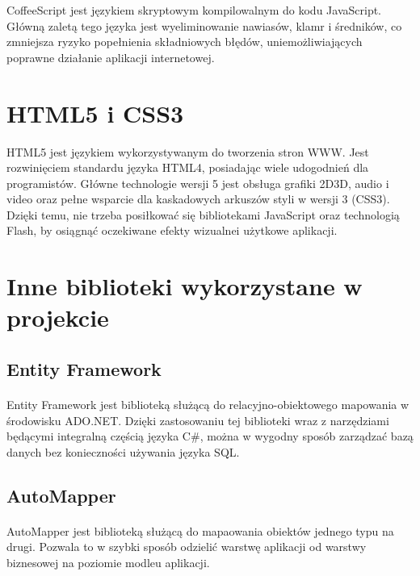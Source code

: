 CoffeeScript jest językiem skryptowym kompilowalnym do kodu JavaScript. Główną zaletą tego języka jest wyeliminowanie nawiasów, klamr i średników, co zmniejsza ryzyko popełnienia składniowych błędów, uniemożliwiających poprawne działanie aplikacji internetowej.

\section{HTML5 i CSS3} %
\label{par:html5_i_css3}

HTML5 jest językiem wykorzystywanym do tworzenia stron WWW. Jest rozwinięciem standardu języka HTML4, posiadając wiele udogodnień dla programistów. Główne technologie wersji 5 jest obsługa grafiki 2D\/3D, audio i video oraz pełne wsparcie dla kaskadowych arkuszów styli w wersji 3 (CSS3). Dzięki temu, nie trzeba posiłkować się bibliotekami JavaScript oraz technologią Flash, by osiągnąć oczekiwane efekty wizualnei użytkowe aplikacji.


\section{Inne biblioteki wykorzystane w projekcie} %
\label{sec:inne_biblioteki_wykorzystane_w_projekcie}

\subsection{Entity Framework} 
\label{sub:EntityFramework}
\paragraph{}
Entity Framework jest biblioteką służącą do relacyjno-obiektowego mapowania w środowisku ADO.NET. Dzięki zastosowaniu tej biblioteki wraz z narzędziami będącymi integralną częścią języka C\#, można w wygodny sposób zarządzać bazą danych bez konieczności używania języka SQL.

\subsection{AutoMapper} %
\label{sub:automapper}
\paragraph{} %
\label{par:}

AutoMapper jest biblioteką służącą do mapaowania obiektów jednego typu na drugi. Pozwala to w szybki sposób odzielić warstwę aplikacji od warstwy biznesowej na poziomie modleu aplikacji.

